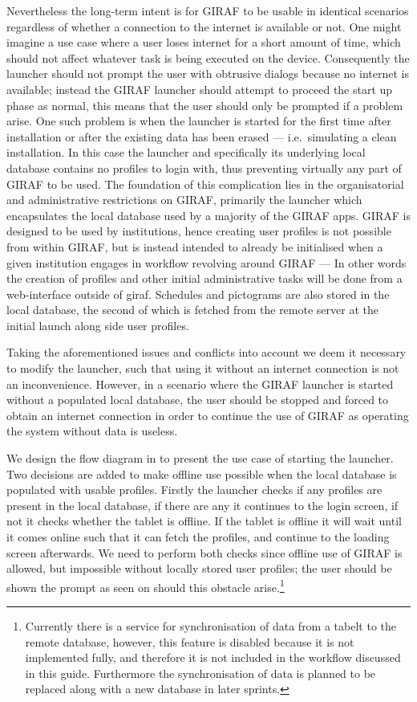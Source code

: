 Nevertheless the long-term intent is for GIRAF to be usable in identical scenarios regardless of whether a connection to the internet is available or not.
One might imagine a use case where a user loses internet for a short amount of time, which should not affect whatever task is being executed on the device. 
Consequently the launcher should not prompt the user with obtrusive dialogs because no internet is available; instead the GIRAF launcher should attempt to proceed the start up phase as normal, this means that the user should only be prompted if a problem arise.
One such problem is when the launcher is started for the first time after installation or after the existing data has been erased --- i.e.\ simulating a clean installation. 
In this case the launcher and specifically its underlying local database contains no profiles to login with, thus preventing virtually any part of GIRAF to be used.
The foundation of this complication lies in the organisatorial and administrative restrictions on GIRAF, primarily the launcher which encapsulates the local database used by a majority of the GIRAF apps.
GIRAF is designed to be used by institutions, hence creating user profiles is not possible from within GIRAF, but is instead intended to already be initialised when a given institution engages in workflow revolving around GIRAF --- In other words the creation of profiles and other initial administrative tasks will be done from a web-interface outside of giraf.
Schedules and pictograms are also stored in the local database, the second of which is fetched from the remote server at the initial launch along side user profiles.

\bigskip \noindent
Taking the aforementioned issues and conflicts into account we deem it necessary to modify the launcher, such that using it without an internet connection is not an inconvenience.
However, in a scenario where the GIRAF launcher is started without a populated local database, the user should be stopped and forced to obtain an internet connection in order to continue the use of GIRAF as operating the system without data is useless.

We design the flow diagram in  to present the use case of starting the launcher.
Two decisions are added to make offline use possible when the local database is populated with usable profiles.
Firstly the launcher checks if any profiles are present in the local database, if there are any it continues to the login screen, if not it checks whether the tablet is offline. 
If the tablet is offline it will wait until it comes online such that it can fetch the profiles, and continue to the loading screen afterwards.
We need to perform both checks since offline use of GIRAF is allowed, but impossible without locally stored user profiles; the user should be shown the prompt as seen on  should this obstacle arise.\footnote{Currently there is a service for synchronisation of data from a tabelt to the remote database, however, this feature is disabled because it is not implemented fully, and therefore it is not included in the workflow discussed in this guide. Furthermore the synchronisation of data is planned to be replaced along with a new database in later sprints.}

